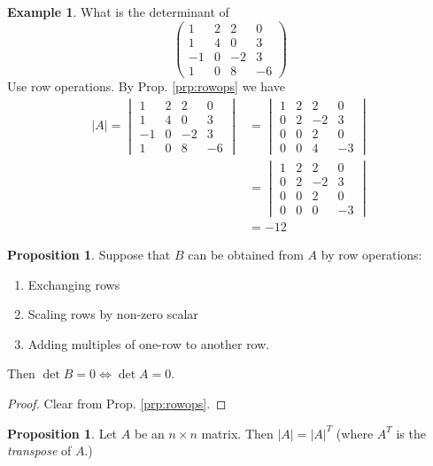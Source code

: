 \documentclass{article}
\theoremstyle{definition} \newtheorem*{definition}{Definition}
\newtheorem{proposition}[theorem]{Proposition}
\newtheorem*{exmp}{Example} \newtheorem*{exmps}{Examples}
\begin{document}
\begin{exmp} What is the determinant of \[ \left(\begin{matrix} 1 & 2 & 2 & 0
    \\ 1 & 4 & 0 & 3 \\ -1 & 0 & -2 & 3 \\ 1 & 0 & 8 & -6 \end{matrix}\right)
\] Use row operations. By Prop. \ref{prp:rowops} we have \begin{align*} |A| =
  \begin{vmatrix} 1 & 2 & 2 & 0 \\ 1 & 4 & 0 & 3 \\ -1 & 0 & -2 & 3 \\ 1 & 0 &
    8 & -6 \end{vmatrix} &= \begin{vmatrix} 1 & 2 & 2 & 0 \\ 0 & 2 & -2 & 3 \\
    0 & 0 & 2 & 0 \\ 0 & 0 & 4 & -3 \end{vmatrix}\\ &= \begin{vmatrix} 1 & 2 &
    2 & 0 \\ 0 & 2 & -2 & 3 \\ 0 & 0 & 2 & 0 \\ 0 & 0 & 0 & -3 \end{vmatrix}\\
  &= -12 \end{align*}

\end{exmp}

\begin{proposition}
  \label{prp:detab} Suppose that $B$ can be obtained from $A$ by row
operations: \begin{enumerate} \item Exchanging rows \item Scaling rows by
    non-zero scalar \item Adding multiples of one-row to another row.
  \end{enumerate} Then $\det B = 0 \iff \det A = 0$.  \end{proposition}

\begin{proof} Clear from Prop. \ref{prp:rowops}.  \end{proof}

\begin{proposition} \label{prp:dettran} Let $A$ be an $n\times n$ matrix. Then
  $|A| = |A|^T$  (where $A^T$ is the \emph{transpose} of $A$.)
\end{proposition}
\end{document}
